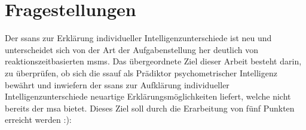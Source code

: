 \documentclass[11pt, twoside, a4paper]{book}		%
\begin{document}





\section{Fragestellungen \label{sec:Fragestellungen}}

Der \gls{ssans} zur Erklärung individueller Intelligenzunterschiede ist neu und unterscheidet sich von der Art der Aufgabenstellung her deutlich von reaktionszeitbasierten \glspl{msm}. Das übergeordnete Ziel dieser Arbeit besteht darin, zu überprüfen, ob sich die \gls{ssauf} als Prädiktor psychometrischer Intelligenz bewährt und inwiefern der \gls{ssans} zur Aufklärung individueller Intelligenzunterschiede neuartige Erklärungsmöglichkeiten liefert, welche nicht bereits der \gls{msa} bietet. Dieses Ziel soll durch die Erarbeitung von fünf Punkten erreicht werden :):
\end{document}
